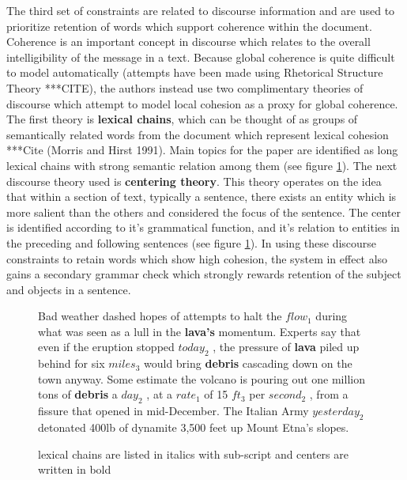 {The third set of constraints are related to discourse information and are used to prioritize retention of words which support coherence within the document.  Coherence is an important concept in discourse which relates to the overall intelligibility of the message in a text.  Because global coherence is quite difficult to model automatically (attempts have been made using Rhetorical Structure Theory ***CITE), the authors instead use two complimentary theories of discourse which attempt to model local cohesion as a proxy for global coherence.  The first theory is \textbf{lexical chains}, which can be thought of as groups of semantically related words from the document which represent lexical cohesion ***Cite (Morris and Hirst 1991).  Main topics for the paper are identified as long lexical chains with strong semantic relation among them (see figure \ref{fig:centering}).  The next discourse theory used is \textbf{centering theory}.  This theory operates on the idea that within a section of text, typically a sentence, there exists an entity which is more salient than the others and considered the focus of the sentence. The center is identified according to it's grammatical function, and it's relation to entities in the preceding and following sentences (see figure \ref{fig:centering}). In using these discourse constraints to retain words which show high cohesion, the system in effect also gains a secondary grammar check which strongly rewards retention of the subject and objects in a sentence.}


\begin{figure}[H]
\centering
\begin{scriptsize}
Bad weather dashed hopes of attempts to halt the $flow_{1}$ during what was seen as a lull in the \textbf{lava's} momentum. Experts say that even if the eruption stopped $today_{2}$ , the pressure of \textbf{lava} piled up behind for six $miles_{3}$ would bring \textbf{debris} cascading down on the town anyway. Some estimate the volcano is pouring out one million tons of \textbf{debris} a $day_{2}$ , at a $rate_{1}$ of 15 $ft_{3}$ per $second_{2}$ , from a fissure that opened in mid-December.
The Italian Army $yesterday_{2}$ detonated 400lb of dynamite 3,500 feet up Mount Etna’s slopes.
\end{scriptsize}

\caption{lexical chains are listed in italics with sub-script and centers are written in bold}
\label{fig:centering}
\end{figure}

